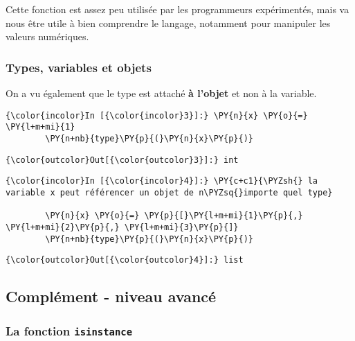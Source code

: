     Cette fonction est assez peu utilisée par les programmeurs expérimentés,
mais va nous être utile à bien comprendre le langage, notamment pour
manipuler les valeurs numériques.

    \hypertarget{types-variables-et-objets}{%
\subsubsection{Types, variables et
objets}\label{types-variables-et-objets}}

    On a vu également que le type est attaché \textbf{à l'objet} et non à la
variable.

    \begin{Verbatim}[commandchars=\\\{\}]
{\color{incolor}In [{\color{incolor}3}]:} \PY{n}{x} \PY{o}{=} \PY{l+m+mi}{1}
        \PY{n+nb}{type}\PY{p}{(}\PY{n}{x}\PY{p}{)}
\end{Verbatim}


\begin{Verbatim}[commandchars=\\\{\}]
{\color{outcolor}Out[{\color{outcolor}3}]:} int
\end{Verbatim}
            
    \begin{Verbatim}[commandchars=\\\{\}]
{\color{incolor}In [{\color{incolor}4}]:} \PY{c+c1}{\PYZsh{} la variable x peut référencer un objet de n\PYZsq{}importe quel type}
        
        \PY{n}{x} \PY{o}{=} \PY{p}{[}\PY{l+m+mi}{1}\PY{p}{,} \PY{l+m+mi}{2}\PY{p}{,} \PY{l+m+mi}{3}\PY{p}{]}
        \PY{n+nb}{type}\PY{p}{(}\PY{n}{x}\PY{p}{)}
\end{Verbatim}


\begin{Verbatim}[commandchars=\\\{\}]
{\color{outcolor}Out[{\color{outcolor}4}]:} list
\end{Verbatim}
            
    \hypertarget{compluxe9ment---niveau-avancuxe9}{%
\subsection{Complément - niveau
avancé}\label{compluxe9ment---niveau-avancuxe9}}

    \hypertarget{la-fonction-isinstance}{%
\subsubsection{\texorpdfstring{La fonction
\texttt{isinstance}}{La fonction isinstance}}\label{la-fonction-isinstance}}

